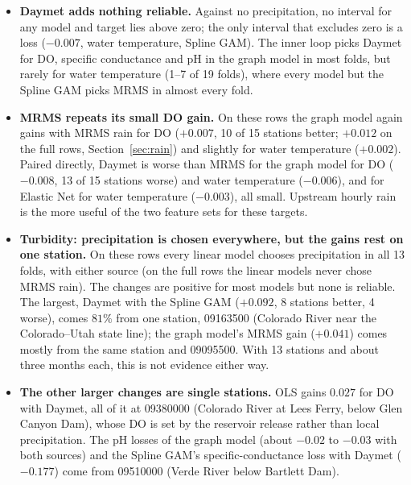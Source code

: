 \documentclass[11pt]{article}
\begin{document}
\begin{itemize}
  \item \textbf{Daymet adds nothing reliable.} Against no precipitation, no interval for any model
        and target lies above zero; the only interval that excludes zero is a loss ($-0.007$, water
        temperature, Spline GAM). The inner loop picks Daymet for DO, specific conductance and pH in
        the graph model in most folds, but rarely for water temperature (1--7 of 19 folds), where
        every model but the Spline GAM picks MRMS in almost every fold.
  \item \textbf{MRMS repeats its small DO gain.} On these rows the graph model again gains with MRMS
        rain for DO ($+0.007$, 10 of 15 stations better; $+0.012$ on the full rows,
        Section~\ref{sec:rain}) and slightly for water temperature ($+0.002$). Paired directly,
        Daymet is worse than MRMS for the graph model for DO ($-0.008$, 13 of 15 stations worse) and
        water temperature ($-0.006$), and for Elastic Net for water temperature ($-0.003$), all
        small. Upstream hourly rain is the more useful of the two feature sets for these targets.
  \item \textbf{Turbidity: precipitation is chosen everywhere, but the gains rest on one station.} On
        these rows every linear model chooses precipitation in all 13 folds, with either source
        (on the full rows the linear models never chose MRMS rain). The changes are positive for
        most models but none is reliable. The largest, Daymet with the Spline GAM ($+0.092$, 8
        stations better, 4 worse), comes $81\%$ from one station, 09163500 (Colorado River near the
        Colorado--Utah state line); the graph model's MRMS gain ($+0.041$) comes mostly from the
        same station and 09095500. With 13 stations and about three months each, this is not
        evidence either way.
  \item \textbf{The other larger changes are single stations.} OLS gains $0.027$ for DO with Daymet,
        all of it at 09380000 (Colorado River at Lees Ferry, below Glen Canyon Dam), whose DO is set
        by the reservoir release rather than local precipitation. The pH losses of the graph model
        (about $-0.02$ to $-0.03$ with both sources) and the Spline GAM's specific-conductance loss
        with Daymet ($-0.177$) come from 09510000 (Verde River below Bartlett Dam).
\end{itemize}


\end{document}
